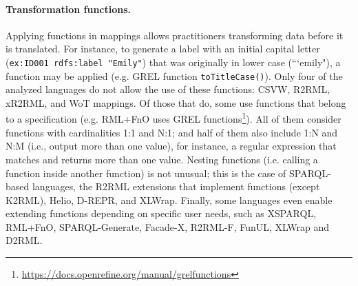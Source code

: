 \noindent\paragraph{\textbf{Transformation functions.}} Applying functions in mappings allows practitioners transforming data before it is translated. For instance, to generate a label with an initial capital letter (\texttt{ex:ID001 rdfs:label "Emily"}) that was originally in lower case (```emily"), a function may be applied (e.g. GREL function \texttt{toTi\-tleCase()}). Only four of the analyzed languages do not allow the use of these functions: CSVW, R2RML, xR2RML, and  WoT mappings. Of those that do, some use functions that belong to a specification (e.g. RML+FnO uses GREL functions\footnote{\url{https://docs.openrefine.org/manual/grelfunctions}}). All of them consider functions with cardinalities 1:1 and N:1; and half of them also include 1:N and N:M (i.e., output more than one value), for instance, a regular expression that matches and returns more than one value.  Nesting functions (i.e. calling a function inside another function) is not unusual; this is the case of SPARQL-based languages, the R2RML extensions that implement functions (except K2RML), Helio, D-REPR, and XLWrap. Finally, some languages even enable extending functions depending on specific user needs, such as XSPARQL, RML+FnO, SPARQL-Generate, Facade-X, R2RML-F, FunUL, XLWrap and D2RML.


